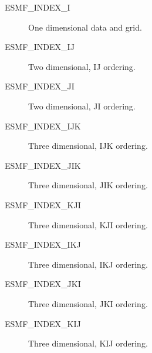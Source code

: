 \begin{description}
   \item[ESMF\_INDEX\_I]  One dimensional data and grid.
   \item[ESMF\_INDEX\_IJ] Two dimensional, IJ ordering.
   \item[ESMF\_INDEX\_JI] Two dimensional, JI ordering.
   \item[ESMF\_INDEX\_IJK] Three dimensional, IJK ordering.
   \item[ESMF\_INDEX\_JIK] Three dimensional, JIK ordering.
   \item[ESMF\_INDEX\_KJI] Three dimensional, KJI ordering.
   \item[ESMF\_INDEX\_IKJ] Three dimensional, IKJ ordering.
   \item[ESMF\_INDEX\_JKI] Three dimensional, JKI ordering.
   \item[ESMF\_INDEX\_KIJ] Three dimensional, KIJ ordering.
\end{description}

